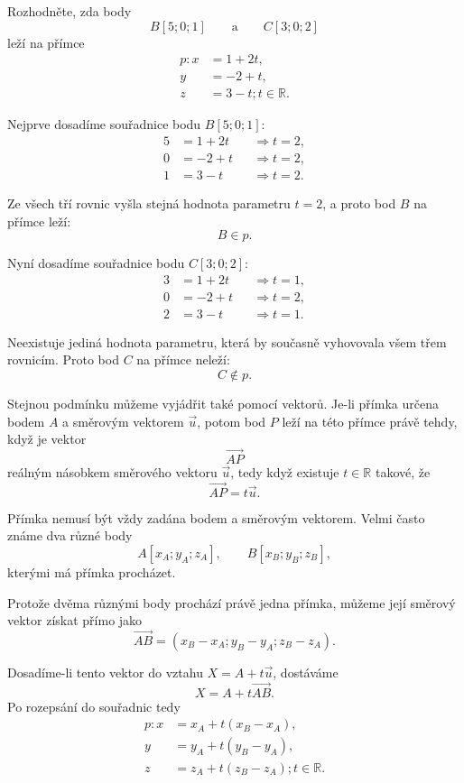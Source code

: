 \begin{example}
    \label{exa:Point_membership_line_space}
    Rozhodněte, zda body
    \[
        B[5;0;1]
        \qquad\text{a}\qquad
        C[3;0;2]
    \]
    leží na přímce
    \[
        \begin{aligned}
            p: x&=1+2t,\\
            y&=-2+t,\\
            z&=3-t; t\in\mathbb{R}.
        \end{aligned}
    \]

    Nejprve dosadíme souřadnice bodu $B[5;0;1]$:
    \begin{align*}
        5&=1+2t &&\Rightarrow t=2,\\
        0&=-2+t &&\Rightarrow t=2,\\
        1&=3-t &&\Rightarrow t=2.
    \end{align*}

    Ze všech tří rovnic vyšla stejná hodnota parametru $t=2$, a proto
    bod $B$ na přímce leží:
    \[
        B\in p.
    \]

    Nyní dosadíme souřadnice bodu $C[3;0;2]$:
    \begin{align*}
        3&=1+2t &&\Rightarrow t=1,\\
        0&=-2+t &&\Rightarrow t=2,\\
        2&=3-t &&\Rightarrow t=1.
    \end{align*}

    Neexistuje jediná hodnota parametru, která by současně vyhovovala
    všem třem rovnicím. Proto bod $C$ na přímce neleží:
    \[
        C\notin p.
    \]
\end{example}

Stejnou podmínku můžeme vyjádřit také pomocí vektorů. Je-li přímka určena
bodem $A$ a směrovým vektorem $\vec{u}$, potom bod $P$ leží na této
přímce právě tehdy, když je vektor
\[
    \overrightarrow{AP}
\]
reálným násobkem směrového vektoru $\vec{u}$, tedy když existuje
$t\in\mathbb{R}$ takové, že
\[
    \overrightarrow{AP}=t\vec{u}.
\]

Přímka nemusí být vždy zadána bodem a směrovým vektorem. Velmi často
známe dva různé body
\[
    A[x_A;y_A;z_A],
    \qquad
    B[x_B;y_B;z_B],
\]
kterými má přímka procházet.

Protože dvěma různými body prochází právě jedna přímka, můžeme její
směrový vektor získat přímo jako
\[
    \overrightarrow{AB}
    =
    (x_B-x_A;y_B-y_A;z_B-z_A).
\]

Dosadíme-li tento vektor do vztahu $X=A+t\vec{u}$, dostáváme
\[
    X=A+t\overrightarrow{AB}.
\]
Po rozepsání do souřadnic tedy
\[
    \begin{aligned}
        p: x&=x_A+t(x_B-x_A),\\
        y&=y_A+t(y_B-y_A),\\
        z&=z_A+t(z_B-z_A); t\in\mathbb{R}.
    \end{aligned}
\]

